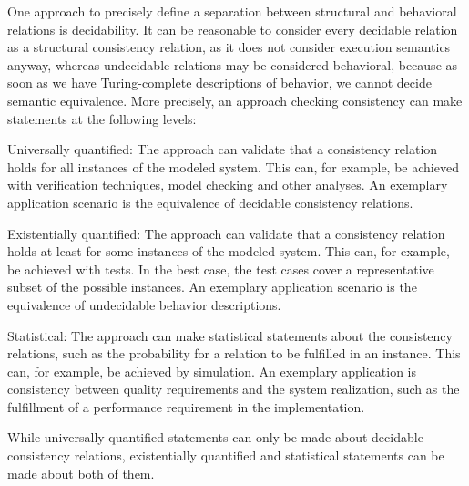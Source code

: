 One approach to precisely define a separation between structural and behavioral relations is decidability.
It can be reasonable to consider every decidable relation as a structural consistency relation, as it does not consider execution semantics anyway, whereas undecidable relations may be considered behavioral,
because as soon as we have Turing-complete descriptions of behavior, we cannot decide semantic equivalence. %
More precisely, an approach checking consistency can make statements at the following levels: %
\begin{properdescription}
    \item[Universally quantified:] The approach can validate that a consistency relation holds for all instances of the modeled system. This can, for example, be achieved with verification techniques, model checking and other analyses. An exemplary application scenario is the equivalence of decidable consistency relations.
    \item[Existentially quantified:] The approach can validate that a consistency relation holds at least for some instances of the modeled system. This can, for example, be achieved with tests. In the best case, the test cases cover a representative subset of the possible instances. An exemplary application scenario is the equivalence of undecidable behavior descriptions.
    \item[Statistical:] The approach can make statistical statements about the consistency relations, such as the probability for a relation to be fulfilled in an instance. This can, for example, be achieved by simulation. An exemplary application is consistency between quality requirements and the system realization, such as the fulfillment of a performance requirement in the implementation.
\end{properdescription}
While universally quantified statements can only be made about decidable consistency relations, existentially quantified and statistical statements can be made about both of them.


